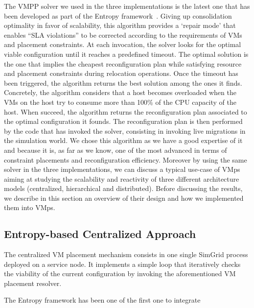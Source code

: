 \documentclass[conference]{IEEEtran}
\newcommand{\sg}{SimGrid\xspace}
\newcommand{\vmps}{VMps\xspace}
\begin{document}
The VMPP solver we used in the three implementations is the latest one
that has been developed as part of the Entropy
framework~\cite{Hermenier:2009:ECM:1508293.1508300, hermenier:cp11}.
Giving up consolidation optimality in favor of scalability, this
algorithm provides a `repair mode' that enables ``SLA violations'' to
be corrected according to the requirements of VMs and placement
constraints. At each invocation, the solver looks for the optimal
viable configuration until it reaches a predefined timeout. The
optimal solution is the one that implies the cheapest reconfiguration
plan while satisfying resource and placement constraints during
relocation operations. Once the timeout has been triggered, the
algorithm returns the best solution among the ones it finds.
Concretely, the algorithm considers that a host becomes overloaded
when the VMs on the host try to consume more than 100\% of the CPU
capacity of the host. When succeed, the algorithm returns the reconfiguration
plan associated to the optimal configuration it founds.  The
reconfiguration plan is then performed by the code that has invoked
the solver, consisting in invoking  live migrations in the simulation world.
%
We chose this algorithm as we have a good expertise of it and because
it is, as far as we know, one of the most advanced in terms of
constraint placements and reconfiguration
efficiency.
%
Moreover by using the same solver in the three implementations, we can
discuss a typical use-case of \vmps aiming at studying the scalability
and reactivity of three different architecture models (centralized,
hierarchical and distributed). Before discussing the results, we
describe in this section an overview of their design and how we
implemented them into \vmps.


\subsection{Entropy-based Centralized Approach}
\label{subsec:entropy}
The centralized VM placement mechanism consists in one single \sg process
deployed on a service node. It implements a simple loop
that iteratively checks the viability of the current configuration by
invoking the aforementioned VM placement resolver.

The Entropy framework has been one of the first one to integrate
\end{document}
